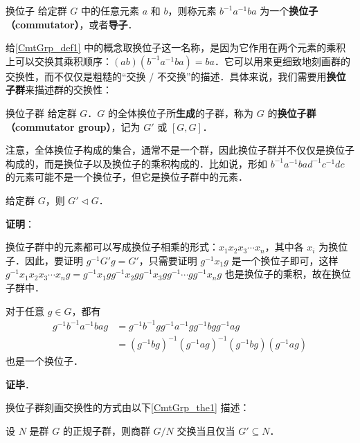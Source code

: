 


\begin{definition}{换位子}\label{CmtGrp_def1}
给定群 $G$ 中的任意元素 $a$ 和 $b$，则称元素 $b^{-1}a^{-1}ba$ 为一个\textbf{换位子（commutator）}，或者\textbf{导子}．
\end{definition}

给\autoref{CmtGrp_def1} 中的概念取换位子这一名称，是因为它作用在两个元素的乘积上可以交换其乘积顺序：$(ab)(b^{-1}a^{-1}ba)=ba$．它可以用来更细致地刻画群的交换性，而不仅仅是粗糙的“交换 / 不交换”的描述．具体来说，我们需要用\textbf{换位子群}来描述群的交换性：

\begin{definition}{换位子群}
给定群 $G$．$G$ 的全体换位子所\textbf{生成}的子群，称为 $G$ 的\textbf{换位子群（commutator group）}，记为 $G'$ 或 $[G, G]$．
\end{definition}

注意，全体换位子构成的集合，通常不是一个群，因此换位子群并不仅仅是换位子构成的，而是换位子以及换位子的乘积构成的．比如说，形如 $b^{-1}a^{-1}bad^{-1}c^{-1}dc$ 的元素可能不是一个换位子，但它是换位子群中的元素．

\begin{theorem}{}
给定群 $G$，则 $G'\triangleleft G$．
\end{theorem}

\textbf{证明}：

换位子群中的元素都可以写成换位子相乘的形式：$x_1x_2x_3\cdots x_n$，其中各 $x_i$ 为换位子．因此，要证明 $g^{-1}G'g=G'$，只需要证明 $g^{-1}x_1g$ 是一个换位子即可，这样 $g^{-1}x_1x_2x_3\cdots x_ng=g^{-1}x_1gg^{-1}x_2gg^{-1}x_3gg^{-1}\cdots gg^{-1}x_ng$ 也是换位子的乘积，故在换位子群中．

对于任意 $g\in G$，都有
\begin{equation}
\begin{aligned}
g^{-1}b^{-1}a^{-1}bag&=g^{-1}b^{-1}gg^{-1}a^{-1}gg^{-1}bgg^{-1}ag\\
&=(g^{-1}bg)^{-1}(g^{-1}ag)^{-1}(g^{-1}bg)(g^{-1}ag)
\end{aligned}
\end{equation}
也是一个换位子．

\textbf{证毕}．

换位子群刻画交换性的方式由以下\autoref{CmtGrp_the1} 描述：

\begin{theorem}{}\label{CmtGrp_the1}
设 $N$ 是群 $G$ 的正规子群，则商群 $G/N$ 交换当且仅当 $G'\subseteq N$．
\end{theorem}

